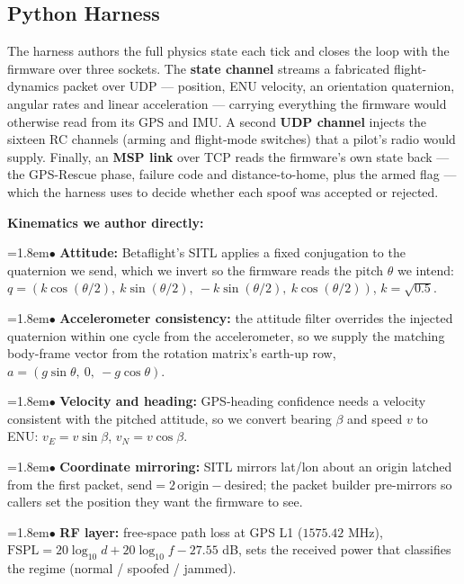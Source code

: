 \documentclass[11pt]{article}
\begin{document}
\subsection*{Python Harness}
The harness authors the full physics state each tick and closes the loop with the firmware over three sockets. The \textbf{state channel} streams a fabricated flight-dynamics packet over UDP — position, ENU velocity, an orientation quaternion, angular rates and linear acceleration — carrying everything the firmware would otherwise read from its GPS and IMU. A second \textbf{UDP channel} injects the sixteen RC channels (arming and flight-mode switches) that a pilot's radio would supply. Finally, an \textbf{MSP link} over TCP reads the firmware's own state back — the GPS-Rescue phase, failure code and distance-to-home, plus the armed flag — which the harness uses to decide whether each spoof was accepted or rejected.

\textbf{Kinematics we author directly:}
\par\hangindent=1.8em\hspace*{1.2em}$\bullet$ \textbf{Attitude:} Betaflight's SITL applies a fixed conjugation to the quaternion we send, which we invert so the firmware reads the pitch $\theta$ we intend: $q = \left(k\cos(\theta/2),\ k\sin(\theta/2),\ -k\sin(\theta/2),\ k\cos(\theta/2)\right)$, $k=\sqrt{0.5}$.
\par\hangindent=1.8em\hspace*{1.2em}$\bullet$ \textbf{Accelerometer consistency:} the attitude filter overrides the injected quaternion within one cycle from the accelerometer, so we supply the matching body-frame vector from the rotation matrix's earth-up row, $a = \left(g\sin\theta,\ 0,\ -g\cos\theta\right)$.
\par\hangindent=1.8em\hspace*{1.2em}$\bullet$ \textbf{Velocity and heading:} GPS-heading confidence needs a velocity consistent with the pitched attitude, so we convert bearing $\beta$ and speed $v$ to ENU: $v_E = v\sin\beta$, $v_N = v\cos\beta$.
\par\hangindent=1.8em\hspace*{1.2em}$\bullet$ \textbf{Coordinate mirroring:} SITL mirrors lat/lon about an origin latched from the first packet, $\mathrm{send} = 2\,\mathrm{origin} - \mathrm{desired}$; the packet builder pre-mirrors so callers set the position they want the firmware to see.
\par\hangindent=1.8em\hspace*{1.2em}$\bullet$ \textbf{RF layer:} free-space path loss at GPS L1 ($1575.42$ MHz), $\mathrm{FSPL} = 20\log_{10} d + 20\log_{10} f - 27.55$ dB, sets the received power that classifies the regime (normal / spoofed / jammed).
\end{document}
